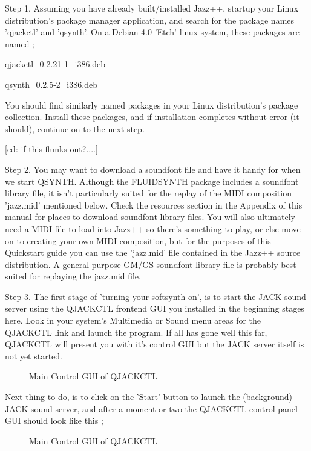 \documentclass[letterpaper]{report}
\begin{document}
Step 1.  Assuming you have already built/installed Jazz++, startup
your Linux distribution's package manager application, and search
for the package names 'qjackctl' and 'qsynth'. On a Debian 4.0 'Etch'
linux system, these packages are named ;

qjackctl\_0.2.21-1\_i386.deb

qsynth\_0.2.5-2\_i386.deb

You should find similarly named packages in your Linux distribution's
package collection. Install these packages, and if installation
completes without error (it should), continue on to the next step.

[ed: if this flunks out?....]


Step 2. You may want to download a soundfont file and have it handy
for when we start QSYNTH. Although the FLUIDSYNTH package includes a
soundfont library file, it isn't particularly suited for the replay of
the MIDI composition 'jazz.mid' mentioned below. Check the resources
section in the Appendix of this manual for places to download soundfont
library files. You will also ultimately need a MIDI file to load into Jazz++
so there's something to play, or else move on to creating your own MIDI
composition, but for the purposes of this Quickstart guide you can use
the 'jazz.mid' file contained in the Jazz++ source distribution. A general
purpose GM/GS soundfont library file is probably best suited for replaying
the jazz.mid file.


Step 3. The first stage of 'turning your softsynth on', is to start the
JACK sound server using the QJACKCTL frontend GUI you installed in the
beginning stages here. Look in your system's Multimedia or Sound menu
areas for the QJACKCTL link and launch the program. If all has gone well
this far, QJACKCTL will present you with it's control GUI but the JACK
server itself is not yet started.

\begin{figure}%
%
%
\caption{Main Control GUI of QJACKCTL}%
\end{figure}%


Next thing to do, is to click on the 'Start' button to launch the
(background) JACK sound server, and after a moment or two the QJACKCTL
control panel GUI should look like this ;


\begin{figure}%
%
%
\caption{Main Control GUI of QJACKCTL}%
\end{figure}%
\end{document}
